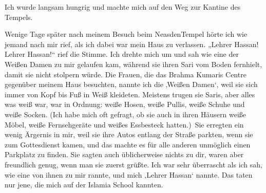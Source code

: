 \documentclass[12pt]{memoir}
\begin{document}
Ich wurde langsam hungrig und machte mich auf den Weg zur Kantine des Tempels.

Wenige Tage später nach meinem Besuch beim Neasden\–Tempel
hörte ich wie jemand nach mir rief, als ich dabei war mein Haus zu verlassen.
„Lehrer Hassan! Lehrer Hassan!“ rief die Stimme.
Ich drehte mich um und sah wie eine der Weißen Damen zu mir gelaufen kam,
während sie ihren Sari vom Boden fernhielt, damit sie nicht stolpern würde.
Die Frauen, die das Brahma Kumaris Centre
gegenüber meinem Haus besuchten, nannte ich die ‚Weißen Damen‘,
weil sie sich immer von Kopf bis Fuß in Weiß kleideten.
Meistens trugen sie Saris, aber alles was weiß war, war in Ordnung:
weiße Hosen, weiße Pullis, weiße Schuhe und weiße Socken.
(Ich habe mich oft gefragt, ob sie auch in ihren Häusern weiße Möbel,
weiße Fernsehgeräte und weißes Essbesteck hatten.)\@\
Sie erregten ein wenig Ärgernis in mir,
weil sie ihre Autos entlang der Straße parkten,
wenn sie zum Gottesdienst kamen,
und das machte es für alle anderen unmöglich einen Parkplatz zu finden.
Sie sagten auch üblicherweise nichts zu dir,
waren aber freundlich genug, wenn man sie zuerst grüßte.
Ich war sehr überrascht als ich sah, wie eine von ihnen zu mir rannte,
und mich ‚Lehrer Hassan‘ nannte.
Das taten nur jene, die mich auf der Islamia School kannten.
\end{document}
